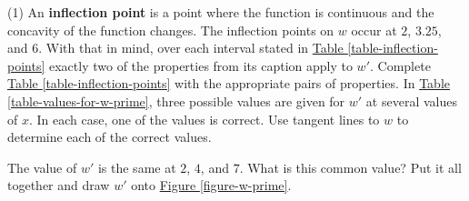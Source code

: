 \documentclass[10pt,oneside,]{book}
\newcommand{\terminology}[1]{\textbf{#1}}
\theoremstyle{plain}
\theoremstyle{definition}
\numberwithin{equation}{section}
\newcommand{\hrulemedium}{\noalign{\hrule height 0.07em}}
\newcommand{\hrulethick} {\noalign{\hrule height 0.11em}}
\newcounter{figstack}
\newcounter{figindex}
\newlength\fight
\newcommand\pushValignCaptionBottom[5][b]{%
\stepcounter{figstack}%
\expandafter\def\csname %
figalign\romannumeral\value{figstack}\endcsname{#1}%
\expandafter\def\csname %
figtype\romannumeral\value{figstack}\endcsname{#2}%
\expandafter\def\csname %
figwd\romannumeral\value{figstack}\endcsname{#3}%
\expandafter\def\csname %
figcontent\romannumeral\value{figstack}\endcsname{#4}%
\expandafter\def\csname %
figcap\romannumeral\value{figstack}\endcsname{#5}%
\setbox0=\hbox{%
\begin{#2}{#3}#4\end{#2}}%
\ifdim\dimexpr\ht0+\dp0\relax>\fight\global\setlength{\fight}{%
\dimexpr\ht0+\dp0\relax}\fi%
}
\newcommand\popValignCaptionBottom{%
\setcounter{figindex}{0}%
\hfill%
\whiledo{\value{figindex}<\value{figstack}}{%
\stepcounter{figindex}%
\def\tmp{\csname figwd\romannumeral\value{figindex}\endcsname}%
\begin{\csname figtype\romannumeral\value{figindex}\endcsname}[t]{\tmp}%
\centering%
\stackinset{c}{}%
{\csname figalign\romannumeral\value{figindex}\endcsname}{}%
{\csname figcontent\romannumeral\value{figindex}\endcsname}%
{\rule{0pt}{\fight}}\par%
\csname figcap\romannumeral\value{figindex}\endcsname%
\end{\csname figtype\romannumeral\value{figindex}\endcsname}%
\hfill%
}%
\setcounter{figstack}{0}%
\setlength{\fight}{0pt}%
\hfill%
}
\newcommand{\fe}[2]{#1\mathopen{}\left(#2\right)\mathclose{}}
\newcommand{\fd}[1]{#1'}
\begin{document}
\begin{exercisegroup}(1)
\exercise[17.]\hypertarget{exercise-245}{\null} An \terminology{inflection point} is a point where the function is continuous and the concavity of the function changes. The inflection points on \(w\) occur at \(2\), \(3.25\), and \(6\). With that in mind, over each interval stated in \hyperref[table-inflection-points]{Table \ref{table-inflection-points}} exactly two of the properties from its caption apply to \(\fd{w}\). Complete \hyperref[table-inflection-points]{Table \ref{table-inflection-points}} with the appropriate pairs of properties.%
\exercise[18.]\hypertarget{exercise-246}{\null}In \hyperref[table-values-for-w-prime]{Table \ref{table-values-for-w-prime}}, three possible values are given for \(\fd{w}\) at several values of \(x\). In each case, one of the values is correct. Use tangent lines to \(w\) to determine each of the correct values.%
\exercise[19.]\hypertarget{exercise-247}{\null}The value of \(\fd{w}\) is the same at \(2\), \(4\), and \(7\). What is this common value?%
\exercise[20.]\hypertarget{exercise-248}{\null}Put it all together and draw \(\fd{w}\) onto \hyperref[figure-w-prime]{Figure \ref{figure-w-prime}}.%
\end{exercisegroup}
\par\smallskip\noindent
\typeout{************************************************}
\typeout{************************************************}
\end{document}
